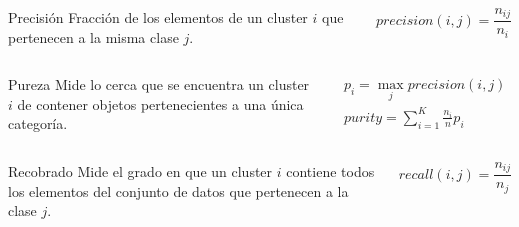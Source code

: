 \begin{frame}

    \begin{columns}

        \begin{block}{Precisión}
            Fracción de los elementos de un cluster $i$ que pertenecen a la misma clase $j$.
        \end{block}


        \begin{equation*}
            precision(i,j) = \frac{n_{ij}}{n_i}
        \end{equation*}

    \end{columns}

    \pause
    \begin{columns}

        \begin{block}{Pureza}
            Mide lo cerca que se encuentra un cluster $i$ de contener objetos pertenecientes a una única categoría.
        \end{block}


        \begin{gather*}
            p_i =\max_{j}{precision(i,j)} \\
            purity = \sum_{i=1}^{K}{\frac{n_i}{n}p_i}
        \end{gather*}

    \end{columns}

    \pause
    \begin{columns}

        \begin{block}{Recobrado}
            Mide el grado en que un cluster $i$ contiene todos los elementos del conjunto de datos que pertenecen a la clase $j$.
        \end{block}


        \begin{equation*}
            recall(i,j) = \frac{n_{ij}}{n_j}
        \end{equation*}

    \end{columns}
\end{frame}

